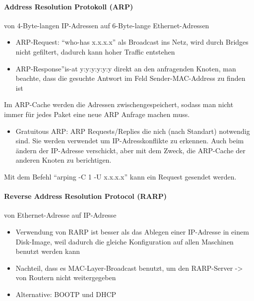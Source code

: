 \paragraph*{Address Resolution Protokoll (ARP)}

von 4-Byte-langen IP-Adressen auf 6-Byte-lange Ethernet-Adressen
\begin{itemize}
\item ARP-Request: ``who-has x.x.x.x'' als Broadcast ins Netz, wird durch
Bridges nicht gefiltert, dadurch kann hoher Traffic entstehen
\item ARP-Response''is-at y:y:y:y:y:y direkt an den anfragenden Knoten,
man beachte, dass die gesuchte Antwort im Feld Sender-MAC-Address
zu finden ist
\end{itemize}
Im ARP-Cache werden die Adressen zwischengespeichert, sodass man nicht
immer für jedes Paket eine neue ARP Anfrage machen muss. 
\begin{itemize}
\item Gratuitous ARP: ARP Requests/Replies die nich (nach Standart) notwendig
sind. Sie werden verwendet um IP-Adresskonflikte zu erkennen. Auch
beim ändern der IP-Adresse verschickt, aber mit dem Zweck, die ARP-Cache
der anderen Knoten zu berichtigen.
\end{itemize}
Mit dem Befehl ``arping -C 1 -U x.x.x.x'' kann ein Request gesendet
werden. 


\paragraph*{Reverse Address Resolution Protocol (RARP)}

von Ethernet-Adresse auf IP-Adresse
\begin{itemize}
\item Verwendung von RARP ist besser als das Ablegen einer IP-Adresse in
einem Disk-Image, weil dadurch die gleiche Konfiguration auf allen
Maschinen benutzt werden kann
\item Nachteil, dass es MAC-Layer-Broadcast benutzt, um den RARP-Server
-> von Routern nicht weitergegeben 
\item Alternative: BOOTP und DHCP\end{itemize}

